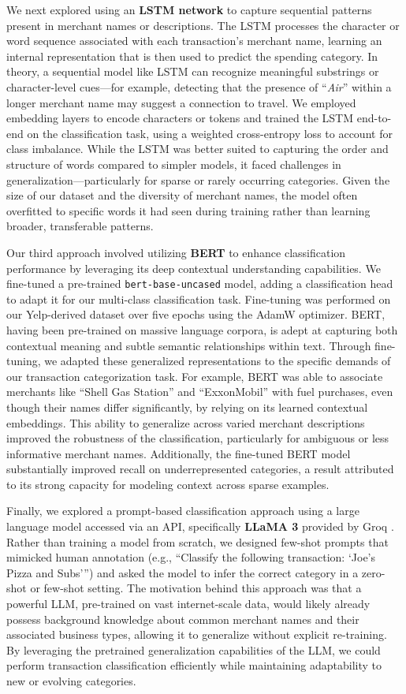 \documentclass[conference]{IEEEtran}
\begin{document}
We next explored using an \textbf{LSTM network} to capture sequential patterns present in merchant names or descriptions. The LSTM processes the character or word sequence associated with each transaction’s merchant name, learning an internal representation that is then used to predict the spending category. In theory, a sequential model like LSTM can recognize meaningful substrings or character-level cues—for example, detecting that the presence of “\emph{Air}” within a longer merchant name may suggest a connection to travel. We employed embedding layers to encode characters or tokens and trained the LSTM end-to-end on the classification task, using a weighted cross-entropy loss to account for class imbalance. 
While the LSTM was better suited to capturing the order and structure of words compared to simpler models, it faced challenges in generalization—particularly for sparse or rarely occurring categories. Given the size of our dataset and the diversity of merchant names, the model often overfitted to specific words it had seen during training rather than learning broader, transferable patterns.

Our third approach involved utilizing \textbf{BERT} \cite{b6} to enhance classification performance by leveraging its deep contextual understanding capabilities. We fine-tuned a pre-trained \texttt{bert-base-uncased} model, adding a classification head to adapt it for our multi-class classification task. Fine-tuning was performed on our Yelp-derived dataset over five epochs using the AdamW optimizer.
BERT, having been pre-trained on massive language corpora, is adept at capturing both contextual meaning and subtle semantic relationships within text. Through fine-tuning, we adapted these generalized representations to the specific demands of our transaction categorization task. For example, BERT was able to associate merchants like “Shell Gas Station” and “ExxonMobil” with fuel purchases, even though their names differ significantly, by relying on its learned contextual embeddings. 
This ability to generalize across varied merchant descriptions improved the robustness of the classification, particularly for ambiguous or less informative merchant names. Additionally, the fine-tuned BERT model substantially improved recall on underrepresented categories, a result attributed to its strong capacity for modeling context across sparse examples.


Finally, we explored a prompt-based classification approach using a large language model accessed via an API, specifically \textbf{LLaMA 3} provided by Groq \cite{groqllama2024}. Rather than training a model from scratch, we designed few-shot prompts that mimicked human annotation (e.g., “Classify the following transaction: ‘Joe’s Pizza and Subs’”) and asked the model to infer the correct category in a zero-shot or few-shot setting. The motivation behind this approach was that a powerful LLM, pre-trained on vast internet-scale data, would likely already possess background knowledge about common merchant names and their associated business types, allowing it to generalize without explicit re-training. By leveraging the pretrained generalization capabilities of the LLM, we could perform transaction classification efficiently while maintaining adaptability to new or evolving categories.
\end{document}
